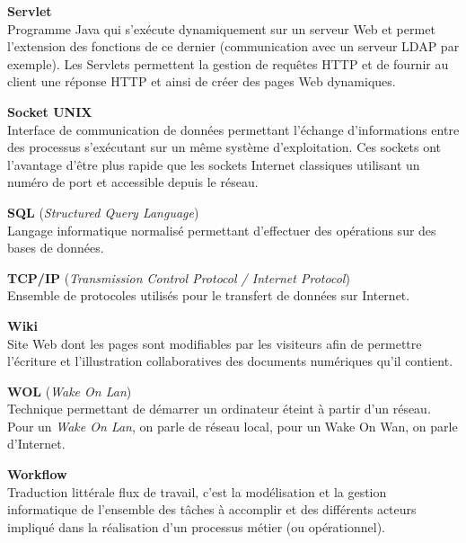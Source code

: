 \vspace{0.5cm}

\textbf{Servlet}\\
Programme Java qui s'ex\'ecute dynamiquement sur un serveur Web et permet l'extension des fonctions de ce dernier (communication avec un serveur LDAP par exemple).
Les Servlets permettent la gestion de requ\^etes HTTP et de fournir au client une r\'eponse HTTP et ainsi de cr\'eer des pages Web dynamiques.

\vspace{0.5cm}

\textbf{Socket UNIX}\\
Interface de communication de donn\'ees permettant l'\'echange d'informations entre des processus s'ex\'ecutant sur un m\^eme syst\`eme d'exploitation.
Ces sockets ont l'avantage d'\^etre plus rapide que les sockets Internet classiques utilisant un num\'ero de port et accessible depuis le r\'eseau.

\vspace{0.5cm}

\textbf{SQL} (\textit{Structured Query Language})\\
Langage informatique normalis\'e permettant d'effectuer des op\'erations sur des bases de donn\'ees.

\vspace{0.5cm}

\textbf{TCP/IP} (\textit{Transmission Control Protocol / Internet Protocol})\\
Ensemble de protocoles utilis\'es pour le transfert de donn\'ees sur Internet.

\vspace{0.5cm}

\textbf{Wiki}\\
Site Web dont les pages sont modifiables par les visiteurs afin de permettre l'\'ecriture et l'illustration collaboratives des documents num\'eriques qu'il contient.

\vspace{0.5cm}

\textbf{WOL} (\textit{Wake On Lan})\\
Technique permettant de d\'emarrer un ordinateur \'eteint \`a partir d'un r\'eseau. 
Pour un \textit{Wake On Lan}, on parle de r\'eseau local, pour un Wake On Wan, on parle d'Internet.

\vspace{0.5cm}

\textbf{Workflow}\\
Traduction litt\'erale \og{}flux de travail\fg{}, c'est la mod\'elisation et la gestion informatique de l'ensemble des t\^aches \`a accomplir et des diff\'erents acteurs impliqu\'e dans la r\'ealisation d'un processus m\'etier (ou op\'erationnel).

\clearpage
